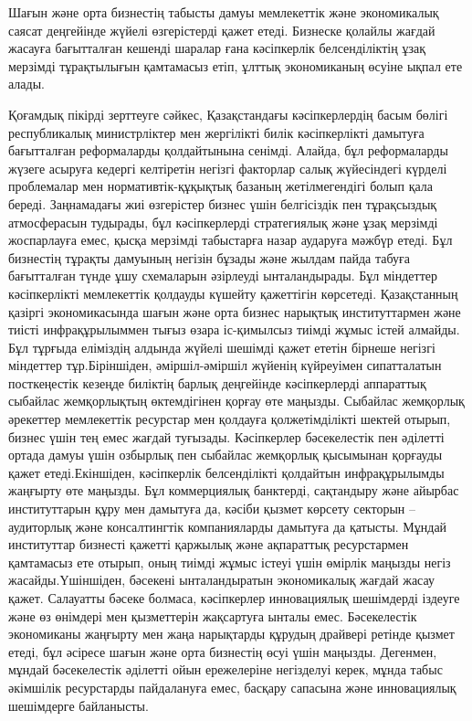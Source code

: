 Шағын және орта бизнестің табысты дамуы мемлекеттік және экономикалық
саясат деңгейінде жүйелі өзгерістерді қажет етеді. Бизнеске қолайлы
жағдай жасауға бағытталған кешенді шаралар ғана кәсіпкерлік
белсенділіктің ұзақ мерзімді тұрақтылығын қамтамасыз етіп, ұлттық
экономиканың өсуіне ықпал ете алады.

Қоғамдық пікірді зерттеуге сәйкес, Қазақстандағы кәсіпкерлердің басым
бөлігі республикалық министрліктер мен жергілікті билік кәсіпкерлікті
дамытуға бағытталған реформаларды қолдайтынына сенімді. Алайда, бұл
реформаларды жүзеге асыруға кедергі келтіретін негізгі факторлар салық
жүйесіндегі күрделі проблемалар мен нормативтік-құқықтық базаның
жетілмегендігі болып қала береді. Заңнамадағы жиі өзгерістер бизнес үшін
белгісіздік пен тұрақсыздық атмосферасын тудырады, бұл кәсіпкерлерді
стратегиялық және ұзақ мерзімді жоспарлауға емес, қысқа мерзімді
табыстарға назар аударуға мәжбүр етеді. Бұл бизнестің тұрақты дамуының
негізін бұзады және жылдам пайда табуға бағытталған түнде ұшу схемаларын
әзірлеуді ынталандырады. Бұл міндеттер кәсіпкерлікті мемлекеттік
қолдауды күшейту қажеттігін көрсетеді. Қазақстанның қазіргі
экономикасында шағын және орта бизнес нарықтық институттармен және
тиісті инфрақұрылыммен тығыз өзара іс-қимылсыз тиімді жұмыс істей
алмайды. Бұл тұрғыда еліміздің алдында жүйелі шешімді қажет ететін
бірнеше негізгі міндеттер тұр.Біріншіден, әміршіл-әміршіл жүйенің
күйреуімен сипатталатын посткеңестік кезеңде биліктің барлық деңгейінде
кәсіпкерлерді аппараттық сыбайлас жемқорлықтың өктемдігінен қорғау өте
маңызды. Сыбайлас жемқорлық әрекеттер мемлекеттік ресурстар мен қолдауға
қолжетімділікті шектей отырып, бизнес үшін тең емес жағдай туғызады.
Кәсіпкерлер бәсекелестік пен әділетті ортада дамуы үшін озбырлық пен
сыбайлас жемқорлық қысымынан қорғауды қажет етеді.Екіншіден, кәсіпкерлік
белсенділікті қолдайтын инфрақұрылымды жаңғырту өте маңызды. Бұл
коммерциялық банктерді, сақтандыру және айырбас институттарын құру мен
дамытуға да, кәсіби қызмет көрсету секторын -- аудиторлық және
консалтингтік компанияларды дамытуға да қатысты. Мұндай институттар
бизнесті қажетті қаржылық және ақпараттық ресурстармен қамтамасыз ете
отырып, оның тиімді жұмыс істеуі үшін өмірлік маңызды негіз
жасайды.Үшіншіден, бәсекені ынталандыратын экономикалық жағдай жасау
қажет. Салауатты бәсеке болмаса, кәсіпкерлер инновациялық шешімдерді
іздеуге және өз өнімдері мен қызметтерін жақсартуға ынталы емес.
Бәсекелестік экономиканы жаңғырту мен жаңа нарықтарды құрудың драйвері
ретінде қызмет етеді, бұл әсіресе шағын және орта бизнестің өсуі үшін
маңызды. Дегенмен, мұндай бәсекелестік әділетті ойын ережелеріне
негізделуі керек, мұнда табыс әкімшілік ресурстарды пайдалануға емес,
басқару сапасына және инновациялық шешімдерге байланысты.

